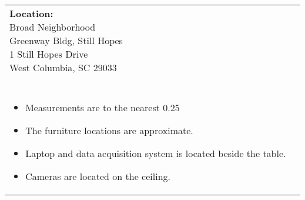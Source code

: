 \documentclass[12pt]{article}
\begin{document}
    \vspace*{\fill}  %
    \begin{table}[H]
	\begin{tabular}{l l}
		\makecell[lt]{
			\textbf{Location:}\\
     		Broad Neighborhood \\
 		    Greenway Bldg, Still Hopes\\
           	1 Still Hopes Drive\\
           	West Columbia, SC 29033\\\\
        }   	
        &	
		\makecell[tp{5in}]{
		\textbf{Notes:}\\
		\vspace{-8mm}  %
		\begin{itemize}
			\setlength\itemsep{-3mm}  %
			\item Measurements are to the nearest \SI{0.25}{\inch}
			\item The furniture locations are approximate.
			\item Laptop and data acquisition system is located beside the table.
			\item Cameras are located on the ceiling.
		\end{itemize}
		}	
			
	\end{tabular}
	\vspace{-8mm} %
\end{table}

    
\end{document}
